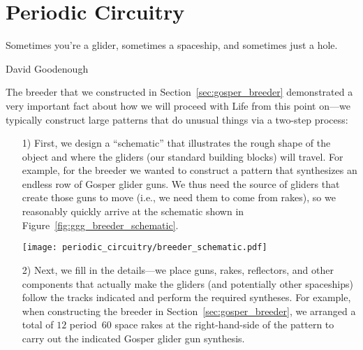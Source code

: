 
\renewcommand{\chapterfolder}{periodic_circuitry/}
\chapter{Periodic Circuitry}\label{chp:periodic_circuitry}


\vspace*{-0.4in}
\epigraph{Sometimes you're a glider, sometimes a spaceship, and sometimes just a hole.}{David Goodenough}
\vspace*{0.4in}


\noindent The breeder that we constructed in Section~\ref{sec:gosper_breeder} demonstrated a very important fact about how we will proceed with Life from this point on---we typically construct large patterns that do unusual things via a two-step process:\smallskip

\begin{enumerate}
	\item[1)] First, we design a ``schematic'' that illustrates the rough shape of the object and where the gliders (our standard building blocks) will travel. For example, for the breeder we wanted to construct a pattern that synthesizes an endless row of Gosper glider guns. We thus need the source of gliders that create those guns to move (i.e., we need them to come from rakes), so we reasonably quickly arrive at the schematic shown in Figure~\ref{fig:ggg_breeder_schematic}.\bigskip
	
	\noindent\begin{minipage}{\linewidth}
		\centering
		\texttt{[image: periodic\_circuitry/breeder\_schematic.pdf]}
		\label{fig:ggg_breeder_schematic}\bigskip
	\end{minipage}
	
	\item[2)] Next, we fill in the details---we place guns, rakes, reflectors, and other components that actually make the gliders (and potentially other spaceships) follow the tracks indicated and perform the required syntheses. For example, when constructing the breeder in Section~\ref{sec:gosper_breeder}, we arranged a total of $12$ period~$60$ space rakes at the right-hand-side of the pattern to carry out the indicated Gosper glider gun synthesis.\smallskip
\end{enumerate}


